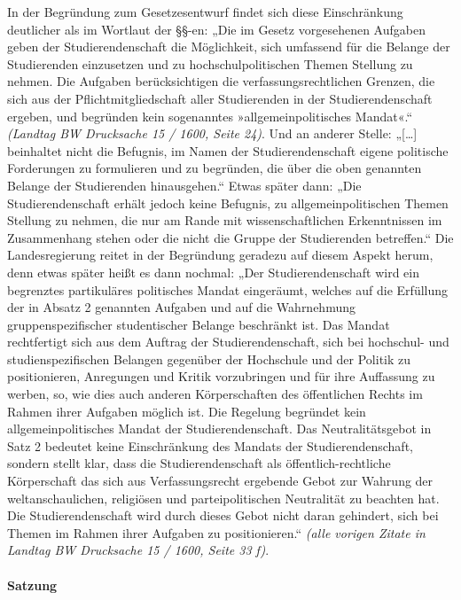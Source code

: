 \documentclass[
10pt,
a4paper,
twoside,								%
titlepage=false,							%
draft=false								%
]{scrartcl}
\begin{document}
In der Begründung zum Gesetzesentwurf findet sich diese Einschränkung deutlicher als im Wortlaut der §§-en: „Die im Gesetz vorgesehenen Aufgaben geben der Studierendenschaft die Möglichkeit, sich umfassend für die Belange der Studierenden einzusetzen und zu hochschulpolitischen Themen Stellung zu nehmen. Die Aufgaben berücksichtigen die verfassungsrechtlichen Grenzen, die sich aus der Pflichtmitgliedschaft aller Studierenden in der Studierendenschaft ergeben, und begründen kein sogenanntes »allgemeinpolitisches Mandat«.“ \textit{(Landtag BW Drucksache 15 / 1600, Seite 24)}. Und an anderer Stelle: „[…] beinhaltet nicht die Befugnis, im Namen der Studierendenschaft eigene politische Forderungen zu formulieren und zu begründen, die über die oben genannten Belange der Studierenden hinausgehen.“ Etwas später dann: „Die Studierendenschaft erhält jedoch keine Befugnis, zu allgemeinpolitischen Themen Stellung zu nehmen, die nur am Rande mit wissenschaftlichen Erkenntnissen im Zusammenhang stehen oder die nicht die Gruppe der Studierenden betreffen.“ Die Landesregierung reitet in der Begründung geradezu auf diesem Aspekt herum, denn etwas später heißt es dann nochmal: „Der Studierendenschaft wird ein begrenztes partikuläres politisches Mandat eingeräumt, welches auf die Erfüllung der in Absatz 2 genannten Aufgaben und auf die Wahrnehmung gruppenspezifischer studentischer Belange beschränkt ist. Das Mandat rechtfertigt sich aus dem Auftrag der Studierendenschaft, sich bei hochschul- und studienspezifischen Belangen gegenüber der Hochschule und der Politik zu positionieren, Anregungen und Kritik vorzubringen und für ihre Auffassung zu werben, so, wie dies auch anderen Körperschaften des öffentlichen Rechts im Rahmen ihrer Aufgaben möglich ist. Die Regelung begründet kein allgemeinpolitisches Mandat der Studierendenschaft. Das Neutralitätsgebot in Satz 2 bedeutet keine Einschränkung des Mandats der Studierendenschaft, sondern stellt klar, dass die Studierendenschaft als öffentlich-rechtliche Körperschaft das sich aus Verfassungsrecht ergebende Gebot zur Wahrung der weltanschaulichen, religiösen und parteipolitischen Neutralität zu beachten hat. Die Studierendenschaft wird durch dieses Gebot nicht daran gehindert, sich bei Themen im Rahmen ihrer Aufgaben zu positionieren.“ \textit{(alle vorigen Zitate in Landtag BW Drucksache 15 / 1600, Seite 33 f)}.


\paragraph{Satzung}
\end{document}
